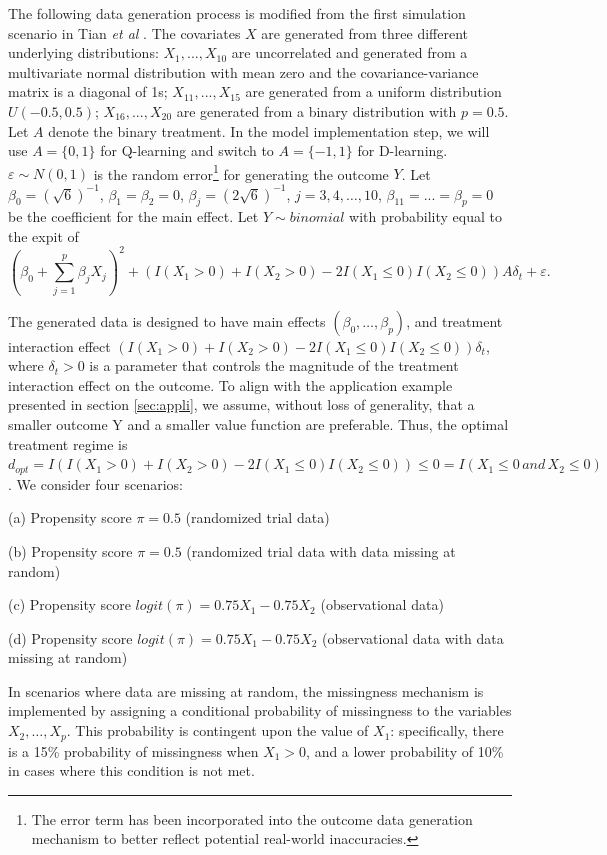 \documentclass{article}
\begin{document}
The following data generation process is modified from the first simulation scenario in Tian \textit{et al} \cite{tian2014simple}. The covariates $X$ are generated from three different underlying distributions: $X_1,...,X_{10}$ are uncorrelated and generated from a multivariate normal distribution with mean zero and the covariance-variance matrix is a diagonal of 1s; $X_{11},...,X_{15}$ are generated from a uniform distribution $U(-0.5,0.5)$; $X_{16},...,X_{20}$ are generated from a binary distribution with $p=0.5$. Let $A$ denote the binary treatment. In the model implementation step, we will use $A=\{0,1\}$ for Q-learning and switch to $A=\{-1,1\}$ for D-learning. $\varepsilon \sim N(0,1)$ is the random error\footnote{The error term has been incorporated into the outcome data generation mechanism to better reflect potential real-world inaccuracies.} for generating the outcome $Y$. Let $\beta_0=(\sqrt{6})^{-1}$, $\beta_1=\beta_2=0$, $\beta_j=(2\sqrt{6})^{-1}$, $j=3,4,\dots,10$, $\beta_{11}=...=\beta_{p} =0$ be the coefficient for the main effect. Let $Y\sim binomial$ with probability equal to the expit of
\begin{equation*}
(\beta_0+\sum_{j=1}^p\beta_jX_j)^2+(I(X_1 > 0) + I(X_2 > 0) - 2I(X_1 \leq 0)I( X_2 \leq 0))A \delta_t+ \varepsilon.
\end{equation*}

The generated data is designed to have main effects $(\beta_0,\dots,\beta_p)$, and treatment interaction effect $(I(X_1 > 0) + I(X_2 > 0) - 2I(X_1 \leq 0)I( X_2 \leq 0))\delta_t$, where $\delta_t>0$ is a parameter that controls the magnitude of the treatment interaction effect on the outcome. To align with the application example presented in section \ref{sec:appli}, we assume, without loss of generality, that a smaller outcome Y and a smaller value function are preferable. Thus, the optimal treatment regime is $d_{opt} = I(I(X_1 > 0) + I(X_2 > 0) - 2I(X_1 \leq 0)I( X_2 \leq 0)) \leq 0=I(X_1 \leq 0\, and\, X_2 \leq 0)$. We consider four scenarios:

(a) Propensity score $\pi=0.5$ (randomized trial data) 

(b) Propensity score $\pi=0.5$ (randomized trial data with data missing at random)

(c) Propensity score $logit(\pi) = 0.75X_1-0.75X_2$ (observational data)

(d) Propensity score $logit(\pi) = 0.75X_1-0.75X_2$ (observational data with data missing at random)


In scenarios where data are missing at random, the missingness mechanism is implemented by assigning a conditional probability of missingness to the variables $X_2, \ldots, X_p$. This probability is contingent upon the value of $X_1$: specifically, there is a 15\% probability of missingness when $X_1 > 0$, and a lower probability of 10\% in cases where this condition is not met.
\end{document}
